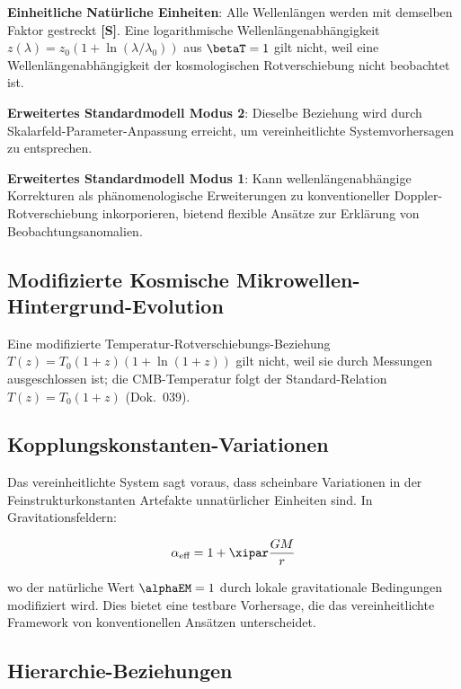 	\textbf{Einheitliche Natürliche Einheiten}: Alle Wellenlängen werden mit demselben Faktor gestreckt \textbf{[S]}. Eine logarithmische Wellenlängenabhängigkeit $z(\lambda) = z_0(1 + \ln(\lambda/\lambda_0))$ aus $\betaT = 1$ gilt nicht, weil eine Wellenlängenabhängigkeit der kosmologischen Rotverschiebung nicht beobachtet ist.
	
	\textbf{Erweitertes Standardmodell Modus 2}: Dieselbe Beziehung wird durch Skalarfeld-Parameter-Anpassung erreicht, um vereinheitlichte Systemvorhersagen zu entsprechen.
	
	\textbf{Erweitertes Standardmodell Modus 1}: Kann wellenlängenabhängige Korrekturen als phänomenologische Erweiterungen zu konventioneller Doppler-Rotverschiebung inkorporieren, bietend flexible Ansätze zur Erklärung von Beobachtungsanomalien.
	
	\subsection{Modifizierte Kosmische Mikrowellen-Hintergrund-Evolution}
	\label{subsec:cmb_evolution}
	
	Eine modifizierte Temperatur-Rotverschiebungs-Beziehung $T(z) = T_0(1+z)(1+\ln(1+z))$ gilt nicht, weil sie durch Messungen ausgeschlossen ist; die CMB-Temperatur folgt der Standard-Relation $T(z) = T_0(1+z)$ (Dok.~039).
	
	\subsection{Kopplungskonstanten-Variationen}
	\label{subsec:coupling_variations}
	
	Das vereinheitlichte System sagt voraus, dass scheinbare Variationen in der Feinstrukturkonstanten Artefakte unnatürlicher Einheiten sind. In Gravitationsfeldern:
	
	\begin{equation}
		\alpha_{\text{eff}} = 1 + \xipar \frac{GM}{r}
	\end{equation}
	
	wo der natürliche Wert $\alphaEM = 1$ durch lokale gravitationale Bedingungen modifiziert wird. Dies bietet eine testbare Vorhersage, die das vereinheitlichte Framework von konventionellen Ansätzen unterscheidet.
	
	\subsection{Hierarchie-Beziehungen}
	\label{subsec:hierarchy_relationships}
	
